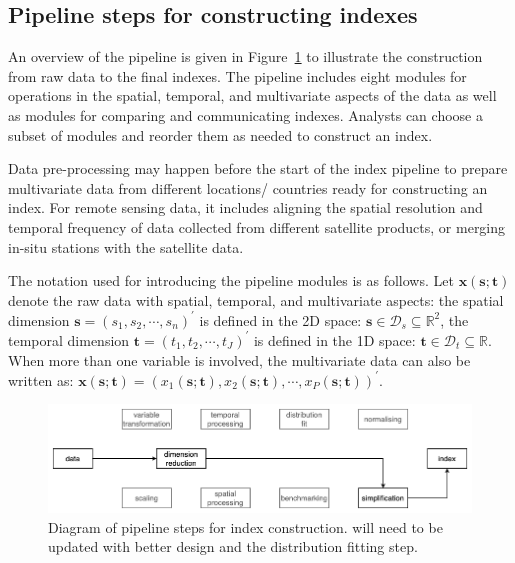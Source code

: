 \documentclass[
]{interact}
\begin{document}
\hypertarget{pipeline-steps-for-constructing-indexes}{%
\subsection{Pipeline steps for constructing
indexes}\label{pipeline-steps-for-constructing-indexes}}

An overview of the pipeline is given in Figure~\ref{fig-pipeline-steps}
to illustrate the construction from raw data to the final indexes. The
pipeline includes eight modules for operations in the spatial, temporal,
and multivariate aspects of the data as well as modules for comparing
and communicating indexes. Analysts can choose a subset of modules and
reorder them as needed to construct an index.

Data pre-processing may happen before the start of the index pipeline to
prepare multivariate data from different locations/ countries ready for
constructing an index. For remote sensing data, it includes aligning the
spatial resolution and temporal frequency of data collected from
different satellite products, or merging in-situ stations with the
satellite data.

The notation used for introducing the pipeline modules is as follows.
Let \(\mathbf{x}(\mathbf{s};\mathbf{t})\) denote the raw data with
spatial, temporal, and multivariate aspects: the spatial dimension
\(\mathbf{s} = (s_1, s_2, \cdots, s_n)^\prime\) is defined in the 2D
space: \(\mathbf{s} \in \mathcal{D}_s \subseteq \mathbb{R}^2\), the
temporal dimension \(\mathbf{t} = (t_1, t_2, \cdots, t_J)^\prime\) is
defined in the 1D space:
\(\mathbf{t} \in \mathcal{D}_t \subseteq \mathbb{R}\). When more than
one variable is involved, the multivariate data can also be written as:
\(\mathbf{x}(\mathbf{s}; \mathbf{t}) = (x_1(\mathbf{s}; \mathbf{t}), x_2(\mathbf{s}; \mathbf{t}), \cdots, x_P(\mathbf{s}; \mathbf{t}))^\prime\).

\begin{figure}

{\centering \includegraphics[width=1\textwidth,height=0.9\textheight]{figures/pipeline-overall.png}

}

\caption{\label{fig-pipeline-steps}Diagram of pipeline steps for index
construction. will need to be updated with better design and the
distribution fitting step.}

\end{figure}
\end{document}
